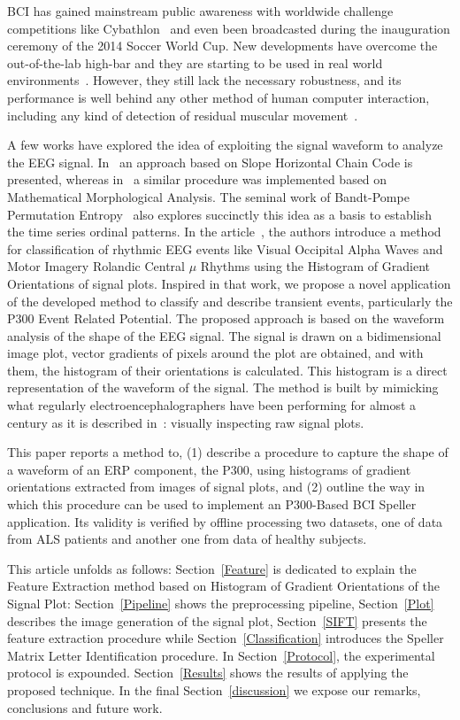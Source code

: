\documentclass[utf8]{frontiersSCNS} %
\begin{document}
BCI has gained mainstream public awareness with worldwide challenge competitions like Cybathlon~\citep{Riener2014,cybathlon2} and even been broadcasted during the inauguration ceremony of the 2014 Soccer World Cup.  New developments have overcome the out-of-the-lab high-bar and they are starting to be used in real world environments~\citep{Guger2017,Huggins2016}.  However, they still lack the necessary robustness, and its performance is well behind any other method of human computer interaction, including any kind of detection of residual muscular movement~\citep{Clerc}.

A few works have explored the idea of exploiting the signal waveform to analyze the EEG signal.  In~\citep{Alvarado-Gonzalez2016} an approach based on Slope Horizontal Chain Code is presented, whereas in~\citep{Yamaguchi2009} a similar procedure was implemented based on Mathematical Morphological Analysis.  The seminal work of Bandt-Pompe Permutation Entropy~\citep{Berger2017} also explores succinctly this idea as a basis to establish the time series ordinal patterns.  In the article~\citep{Ramele2016},  the authors introduce a method for classification of rhythmic EEG events like Visual Occipital Alpha Waves  and Motor Imagery Rolandic Central $\mu$ Rhythms using the Histogram of Gradient Orientations of signal plots.  Inspired in that work, we propose a novel application of the developed method to classify and describe transient events, particularly the P300 Event Related Potential.  
The proposed approach is based on the waveform analysis of the shape of the EEG signal.  The signal is drawn on a bidimensional image plot, vector gradients of pixels around the plot are obtained, and with them, the histogram of their orientations is calculated.  This histogram is a direct representation of the waveform of the signal. The method is built by mimicking what regularly electroencephalographers have been performing for almost a century as it is described in~\citep{Hartman2005}: visually inspecting raw signal plots.

This paper reports a method to, (1) describe a procedure to capture the shape of a waveform of an ERP component, the P300, using histograms of gradient orientations extracted from images of signal plots, and (2) outline the way in which this procedure can be used to implement an P300-Based BCI Speller application. Its validity is verified by offline processing two datasets, one of data from ALS patients and another one from data of healthy subjects. 

This article unfolds as follows: Section~\ref{Feature} is dedicated to explain the Feature Extraction method based on Histogram of Gradient Orientations of the Signal Plot: Section~\ref{Pipeline} shows the preprocessing pipeline,  Section~\ref{Plot}  describes the image generation of the signal plot, Section~\ref{SIFT}  presents the feature extraction procedure while  Section~\ref{Classification}  introduces the Speller Matrix Letter Identification procedure.  In Section~\ref{Protocol}, the experimental protocol is expounded. Section~\ref{Results} shows the results of applying the proposed technique.  In the final Section~\ref{discussion}  we expose our remarks, conclusions and future work.
\end{document}
